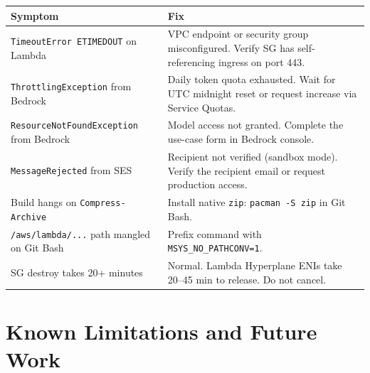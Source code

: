\documentclass[11pt,a4paper]{article}
\begin{document}
\begin{tabularx}{\textwidth}{lX}
\toprule
\textbf{Symptom} & \textbf{Fix} \\
\midrule
\texttt{TimeoutError ETIMEDOUT} on Lambda & VPC endpoint or security group misconfigured. Verify SG has self-referencing ingress on port 443. \\
\texttt{ThrottlingException} from Bedrock & Daily token quota exhausted. Wait for UTC midnight reset or request increase via Service Quotas. \\
\texttt{ResourceNotFoundException} from Bedrock & Model access not granted. Complete the use-case form in Bedrock console. \\
\texttt{MessageRejected} from SES & Recipient not verified (sandbox mode). Verify the recipient email or request production access. \\
Build hangs on \texttt{Compress-Archive} & Install native \texttt{zip}: \texttt{pacman -S zip} in Git Bash. \\
\texttt{/aws/lambda/...} path mangled on Git Bash & Prefix command with \texttt{MSYS\_NO\_PATHCONV=1}. \\
SG destroy takes 20+ minutes & Normal. Lambda Hyperplane ENIs take 20--45 min to release. Do not cancel. \\
\bottomrule
\end{tabularx}

\section{Known Limitations and Future Work}
\end{document}
